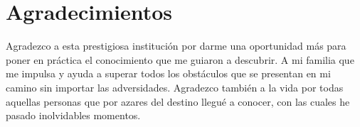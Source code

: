 \chapter{Agradecimientos}

Agradezco a esta prestigiosa institución por darme una oportunidad más para poner en práctica el conocimiento que me guiaron a descubrir. A mi familia que me impulsa y ayuda a superar todos los obstáculos que se presentan en mi camino sin importar las adversidades. Agradezco también a la vida por todas aquellas personas que por azares del destino llegué a conocer, con las cuales he pasado inolvidables momentos.\\